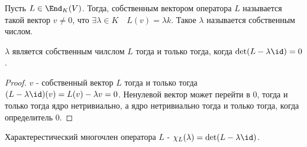 \begin{definition} \thmslashn 

    Пусть $L\in \End_{K}(V)$. Тогда, собственным вектором оператора $L$ называется такой вектор $v \neq 0$, что $\exists{\lambda\in K}\quad L(v) = \lambda k$. Такое $\lambda$ называется собственным числом.
\end{definition}
\begin{lemma} \thmslashn

    $\lambda$ является собственным чилслом $L$ тогда и только тогда, когда $\det(L - \lambda\id) = 0$.
    \begin{proof} \thmslashn
    
        $v$ - собственный вектор $L$ тогда и только тогда $(L - \lambda\id)(v) = L(v) - \lambda v = 0$. Ненулевой вектор может перейти в $0$, тогда и только тогда ядро нетривиально, а ядро нетривиально тогда и только тогда, когда определитель $0$.
    \end{proof}
\end{lemma}
\begin{definition} \thmslashn 

    Характерестический многочлен оператора $L$ - $\chi_{L}(\lambda) = \det(L - \lambda\id)$.
\end{definition}
